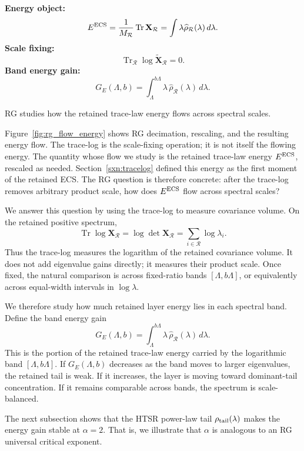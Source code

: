 \documentclass[10pt,twocolumn]{article}
\newcommand{\Tr}{\operatorname{Tr}}
\newcommand{\X}{\mathbf X}
\newcommand{\Xtilde}{\widetilde{\mathbf X}}
\newcommand{\XR}{\mathbf X_{\mathcal R}}
\newcommand{\Rell}{\mathcal R}
\newcommand{\rhohat}{\widehat\rho}
\newif\ifUseTildeECSNotation
\newcommand{\Mred}{M_{\Rell}}
\newcommand{\Ered}{\ifUseTildeECSNotation \widetilde E\else E^{\rm ECS}\fi}
\newcommand{\takeaway}[1]{%
  \par\vspace{4pt}\noindent\textcolor{boxblue}{#1}%
}
\begin{document}
\begin{tcolorbox}[marginalbox,title=\textbf{9. SETOL $\rightarrow$ RG energy flow}]
\small
\textbf{Energy object:}
\[
\Ered=\frac{1}{\Mred}\Tr\XR
=\int \lambda \rhohat_{\Rell}(\lambda)\,d\lambda .
\]
\textbf{Scale fixing:}
\[
\Tr_{\Rell}\log\Xtilde_{\Rell}=0 .
\]
\textbf{Band energy gain:}
\[
G_E(\Lambda,b)
=
\int_{\Lambda}^{b\Lambda}\lambda\,\rhohat_{\Rell}(\lambda)\,d\lambda .
\]
\takeaway{RG studies how the retained trace-law energy flows across spectral scales.}
\end{tcolorbox}

Figure~\ref{fig:rg_flow_energy} shows RG decimation, rescaling, and the resulting energy flow. The trace-log is the scale-fixing operation;
it is not itself the flowing energy. The quantity whose flow we study is the retained trace-law energy $\Ered$,
rescaled as needed.
Section~\ref{sxn:tracelog} defined this energy as the first moment of the retained ECS.
The RG question is therefore concrete: after the trace-log removes arbitrary product scale,
how does $\Ered$ flow across spectral scales?

We answer this question by using the trace-log to measure covariance volume. On the retained positive spectrum,
\begin{equation}
\Tr\log\X_{\Rell}
=
\log\det\X_{\Rell}
=
\sum_{i\in\Rell}\log\lambda_i .
\end{equation}
Thus the trace-log measures the logarithm of the retained covariance volume. It does not add eigenvalue gains directly;
it measures their product scale.
Once fixed, the natural comparison is across fixed-ratio bands $[\Lambda,b\Lambda]$,
or equivalently across equal-width intervals in $\log\lambda$.

We therefore study how much retained layer energy lies in each spectral band. Define the band energy gain
\begin{equation}
G_E(\Lambda,b)
=
\int_{\Lambda}^{b\Lambda}
\lambda\,\widehat\rho_{\Rell}(\lambda)\,d\lambda .
\end{equation}
This is the portion of the retained trace-law energy carried by the logarithmic band $[\Lambda,b\Lambda]$. If $G_E(\Lambda,b)$ decreases as the band moves to larger eigenvalues, the retained tail is weak. If it increases, the layer is moving toward dominant-tail concentration. If it remains comparable across bands, the spectrum is scale-balanced.

The next subsection shows that the HTSR power-law tail $\rho_{\rm tail}(\lambda)$ makes the energy gain stable at $\alpha=2$.
That is, we illustrate that $\alpha$ is analogous to an RG universal critical exponent.
\end{document}
